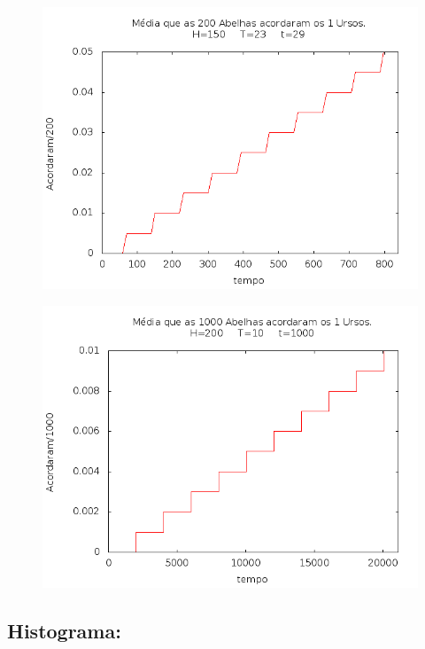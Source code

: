 \documentclass[12pt,a4paper]{article}
\begin{document}
\begin{figure}[!htb]
\centering
\includegraphics[width=0.7\paperwidth]{./graficos/abelhas_200_1_150_29_23.png}
\label{Rotulo}
\end{figure}

\begin{figure}[!htb]
\centering
\includegraphics[width=0.7\paperwidth]{./graficos/abelhas_1000_1_200_1000_10.png}
\label{Rotulo}
\end{figure}

\clearpage
\subsection{Histograma:}
\end{document}
